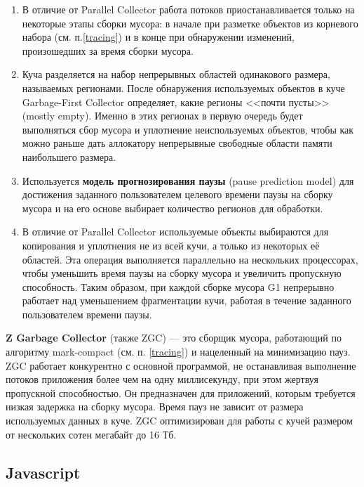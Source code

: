 \begin{enumerate}[label*=\arabic*.]
	\item В отличие от Parallel Collector работа потоков приостанавливается только на некоторые этапы сборки мусора: в начале при разметке объектов из корневого набора (см. п.\ref{tracing}) и в конце при обнаружении изменений, произошедших за время сборки мусора.~\cite{java_jrockit_memory} %
	\item Куча разделяется на набор непрерывных областей одинакового размера, называемых регионами. После обнаружения используемых объектов в куче Garbage-First Collector определяет, какие регионы <<почти пусты>> (mostly empty). Именно в этих регионах в первую очередь будет выполняться сбор мусора и уплотнение неиспользуемых объектов, чтобы как можно раньше дать аллокатору непрерывные свободные области памяти наибольшего размера.
	\item Используется \textbf{модель прогнозирования паузы} (pause prediction model) для достижения заданного пользователем целевого времени паузы на сборку мусора и на его основе выбирает количество регионов для обработки.
	\item В отличие от Parallel Collector используемые объекты выбираются для копирования и уплотнения не из всей кучи, а только из некоторых её областей. Эта операция выполняется параллельно на нескольких процессорах, чтобы уменьшить время паузы на сборку мусора и увеличить пропускную способность. Таким образом, при каждой сборке мусора G1 непрерывно работает над уменьшением фрагментации кучи, работая в течение заданного пользователем времени паузы.
\end{enumerate}

\textbf{Z Garbage Collector} (также ZGC) --- это сборщик мусора, работающий по алгоритму mark-compact (см. п. \ref{tracing}) и нацеленный на минимизацию пауз. ZGC работает конкурентно с основной программой, не останавливая выполнение потоков приложения более чем на одну миллисекунду, при этом жертвуя пропускной способностью. Он предназначен для приложений, которым требуется низкая задержка на сборку мусора. Время пауз не зависит от размера используемых данных в куче. ZGC оптимизирован для работы с кучей размером от нескольких сотен мегабайт до 16 Тб.~\cite{java_zgc}

\subsection{Javascript}

